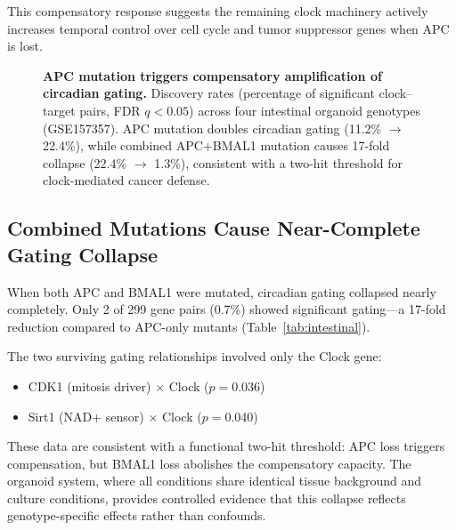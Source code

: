 \documentclass[11pt,letterpaper]{article}
\begin{document}
This compensatory response suggests the remaining clock machinery actively increases temporal control over cell cycle and tumor suppressor genes when APC is lost.

\begin{figure}[H]
\centering
{}
\caption{\textbf{APC mutation triggers compensatory amplification of circadian gating.} Discovery rates (percentage of significant clock--target pairs, FDR $q < 0.05$) across four intestinal organoid genotypes (GSE157357). APC mutation doubles circadian gating (11.2\% $\rightarrow$ 22.4\%), while combined APC+BMAL1 mutation causes 17-fold collapse (22.4\% $\rightarrow$ 1.3\%), consistent with a two-hit threshold for clock-mediated cancer defense.}
\label{fig:compensatory}
\end{figure}

\subsection{Combined Mutations Cause Near-Complete Gating Collapse}

When both APC and BMAL1 were mutated, circadian gating collapsed nearly completely. Only 2 of 299 gene pairs (0.7\%) showed significant gating---a 17-fold reduction compared to APC-only mutants (Table~\ref{tab:intestinal}).

The two surviving gating relationships involved only the Clock gene:
\begin{itemize}[noitemsep]
    \item CDK1 (mitosis driver) $\times$ Clock ($p = 0.036$)
    \item Sirt1 (NAD+ sensor) $\times$ Clock ($p = 0.040$)
\end{itemize}

These data are consistent with a functional two-hit threshold: APC loss triggers compensation, but BMAL1 loss abolishes the compensatory capacity. The organoid system, where all conditions share identical tissue background and culture conditions, provides controlled evidence that this collapse reflects genotype-specific effects rather than confounds.
\end{document}
